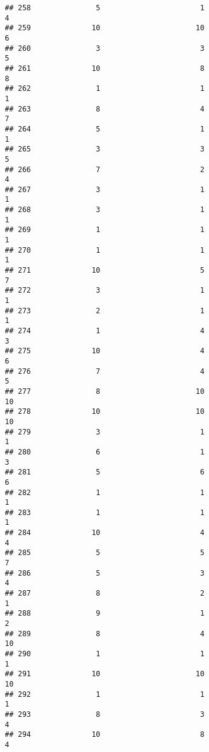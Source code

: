 \documentclass[
]{article}
\begin{document}
\begin{verbatim}
## 258               5                       1                        4
## 259              10                      10                        6
## 260               3                       3                        5
## 261              10                       8                        8
## 262               1                       1                        1
## 263               8                       4                        7
## 264               5                       1                        1
## 265               3                       3                        5
## 266               7                       2                        4
## 267               3                       1                        1
## 268               3                       1                        1
## 269               1                       1                        1
## 270               1                       1                        1
## 271              10                       5                        7
## 272               3                       1                        1
## 273               2                       1                        1
## 274               1                       4                        3
## 275              10                       4                        6
## 276               7                       4                        5
## 277               8                      10                       10
## 278              10                      10                       10
## 279               3                       1                        1
## 280               6                       1                        3
## 281               5                       6                        6
## 282               1                       1                        1
## 283               1                       1                        1
## 284              10                       4                        4
## 285               5                       5                        7
## 286               5                       3                        4
## 287               8                       2                        1
## 288               9                       1                        2
## 289               8                       4                       10
## 290               1                       1                        1
## 291              10                      10                       10
## 292               1                       1                        1
## 293               8                       3                        4
## 294              10                       8                        4

\end{verbatim}
\end{document}
